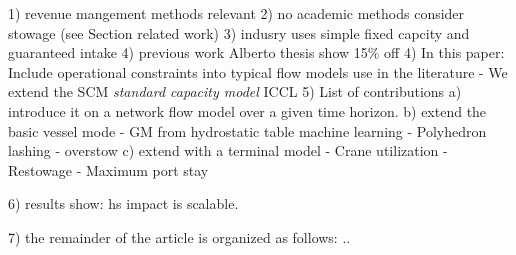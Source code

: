 1) revenue mangement methods relevant
2) no academic methods consider stowage (see Section related work)
3) indusry uses simple fixed capcity and guaranteed intake
4) previous work Alberto thesis show 15\% off 
4) In this paper: Include operational constraints into typical flow models use in the literature 
   - We extend the SCM {\em standard capacity model} ICCL
5) List of contributions
   a) introduce it on a network flow model over a given time horizon. 
   b) extend the basic vessel mode 
      - GM from hydrostatic table machine learning
      - Polyhedron lashing
      - overstow
   c) extend with a terminal model
      - Crane utilization
      - Restowage
      - Maximum port stay
    
6) results show: hs impact is scalable.

7) the remainder of the article is organized as follows: ..

